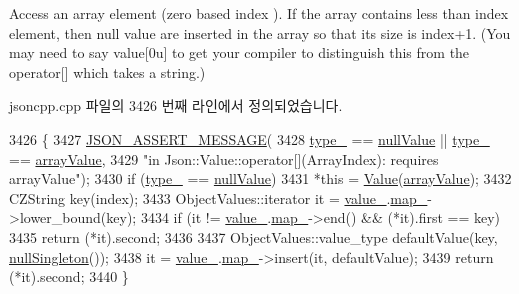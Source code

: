 Access an array element (zero based index ). If the array contains less than index element, then null value are inserted in the array so that its size is index+1. (You may need to say \textquotesingle{}value\mbox{[}0u\mbox{]}\textquotesingle{} to get your compiler to distinguish this from the operator\mbox{[}\mbox{]} which takes a string.) 

jsoncpp.\+cpp 파일의 3426 번째 라인에서 정의되었습니다.


\begin{DoxyCode}
3426                                          \{
3427   \hyperlink{json_8h_ad7facdeeca0f495765e3b204c265eadb}{JSON\_ASSERT\_MESSAGE}(
3428       \hyperlink{class_json_1_1_value_abd222c2536dc88bf330dedcd076d2356}{type\_} == \hyperlink{namespace_json_a7d654b75c16a57007925868e38212b4ea7d9899633b4409bd3fc107e6737f8391}{nullValue} || \hyperlink{class_json_1_1_value_abd222c2536dc88bf330dedcd076d2356}{type\_} == \hyperlink{namespace_json_a7d654b75c16a57007925868e38212b4eadc8f264f36b55b063c78126b335415f4}{arrayValue},
3429       \textcolor{stringliteral}{"in Json::Value::operator[](ArrayIndex): requires arrayValue"});
3430   \textcolor{keywordflow}{if} (\hyperlink{class_json_1_1_value_abd222c2536dc88bf330dedcd076d2356}{type\_} == \hyperlink{namespace_json_a7d654b75c16a57007925868e38212b4ea7d9899633b4409bd3fc107e6737f8391}{nullValue})
3431     *\textcolor{keyword}{this} = \hyperlink{class_json_1_1_value_ada6ba1369448fb0240bccc36efaa46f7}{Value}(\hyperlink{namespace_json_a7d654b75c16a57007925868e38212b4eadc8f264f36b55b063c78126b335415f4}{arrayValue});
3432   CZString key(index);
3433   ObjectValues::iterator it = \hyperlink{class_json_1_1_value_aef578244546212705b9f81eb84d7e151}{value\_}.\hyperlink{union_json_1_1_value_1_1_value_holder_a1e7a5b86d4f52234f55c847ad1ce389a}{map\_}->lower\_bound(key);
3434   \textcolor{keywordflow}{if} (it != \hyperlink{class_json_1_1_value_aef578244546212705b9f81eb84d7e151}{value\_}.\hyperlink{union_json_1_1_value_1_1_value_holder_a1e7a5b86d4f52234f55c847ad1ce389a}{map\_}->end() && (*it).first == key)
3435     \textcolor{keywordflow}{return} (*it).second;
3436 
3437   ObjectValues::value\_type defaultValue(key, \hyperlink{class_json_1_1_value_af2f124567acc35d021a424e53ebdfcab}{nullSingleton}());
3438   it = \hyperlink{class_json_1_1_value_aef578244546212705b9f81eb84d7e151}{value\_}.\hyperlink{union_json_1_1_value_1_1_value_holder_a1e7a5b86d4f52234f55c847ad1ce389a}{map\_}->insert(it, defaultValue);
3439   \textcolor{keywordflow}{return} (*it).second;
3440 \}
\end{DoxyCode}
